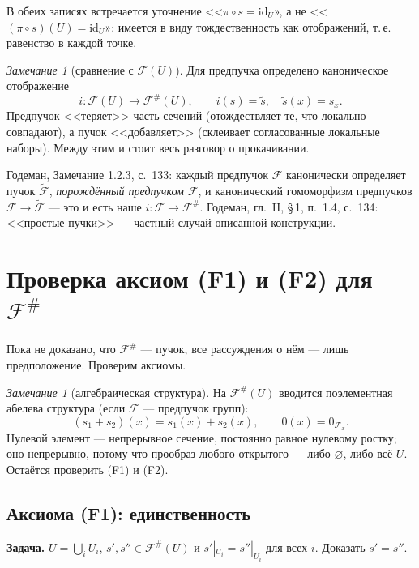 \documentclass[11pt,b5paper]{article}
\newcommand{\id}{\mathrm{id}}
\newcommand{\Shv}[1]{\mathscr{#1}}   %
\theoremstyle{plain}
\theoremstyle{definition}
\theoremstyle{remark}
\newtheorem{reminner}[thminner]{Замечание}
\newcommand{\thmbeg}{%
  \par\smallskip
  \begin{lrbox}{\thmbox}%
  \begin{minipage}{\linewidth}}
\newcommand{\thmend}{%
  \end{minipage}%
  \end{lrbox}%
  \noindent\usebox{\thmbox}%
  \par\smallskip}
\newenvironment{rem}{\thmbeg\begin{reminner}}{\end{reminner}\thmend}
\newenvironment{bookbox}{\par\smallskip\begingroup\color{gray}\noindent
  \ignorespaces}{\par\endgroup\smallskip}
\newcommand{\booksrc}[1]{%
  \noindent{\bfseries\small Дополнение из книги:}\par\smallskip
  \noindent#1\par\smallskip}
\let\brutsection\section
\renewcommand{\section}{\Needspace{7\baselineskip}\brutsection}
\let\brutsubsection\subsection
\renewcommand{\subsection}{\Needspace{5\baselineskip}\brutsubsection}
\begin{document}
В обеих записях встречается уточнение <<$\pi\circ s=\id_U$», а не
<<$(\pi\circ s)(U)=\id_U$»: имеется в виду тождественность как
отображений, т.\,е. равенство в каждой точке.

\begin{rem}[сравнение с $\Shv{F}(U)$]
Для предпучка определено каноническое отображение
\begin{equation}\label{eq:i}
 i\colon\Shv{F}(U)\longrightarrow\Shv{F}^{\#}(U),\qquad
 i(s)=\tilde s,\quad \tilde s(x)=s_x.
\end{equation}
Предпучок <<теряет>> часть сечений (отождествляет те, что локально
совпадают), а пучок <<добавляет>> (склеивает согласованные локальные
наборы). Между этим и стоит весь разговор о прокачивании.
\end{rem}

\begin{bookbox}
\booksrc{Годеман, Замечание 1.2.3, с.~133: каждый предпучок
 $\Shv{F}$ канонически определяет пучок $\tilde{\Shv{F}}$,
 \emph{порождённый предпучком $\Shv{F}$}, и канонический гомоморфизм
 предпучков $\Shv{F}\to\tilde{\Shv{F}}$ --- это и есть наше
 $i\colon\Shv{F}\to\Shv{F}^{\#}$. Годеман, гл.~II, \S\,1, п.~1.4,
 с.~134: <<простые пучки>> --- частный случай описанной конструкции.
}
\end{bookbox}

\section{Проверка аксиом (F1) и (F2) для $\Shv{F}^{\#}$}\label{sec:axioms}

Пока не доказано, что $\Shv{F}^{\#}$ --- пучок, все рассуждения о нём
--- лишь предположение. Проверим аксиомы.

\begin{rem}[алгебраическая структура]
На $\Shv{F}^{\#}(U)$ вводится поэлементная абелева структура (если
$\Shv{F}$ --- предпучок групп):
\[
 (s_1+s_2)(x)=s_1(x)+s_2(x),\qquad
 0(x)=0_{\Shv{F}_x}.
\]
Нулевой элемент --- непрерывное сечение, постоянно равное нулевому
ростку; оно непрерывно, потому что прообраз любого открытого ---
либо $\varnothing$, либо всё $U$. Остаётся проверить (F1) и (F2).
\end{rem}

\subsection{Аксиома (F1): единственность}
\textbf{Задача.} $U=\bigcup_i U_i$, $s',s''\in\Shv{F}^{\#}(U)$ и
$s'|_{U_i}=s''|_{U_i}$ для всех $i$. Доказать $s'=s''$.
\end{document}
